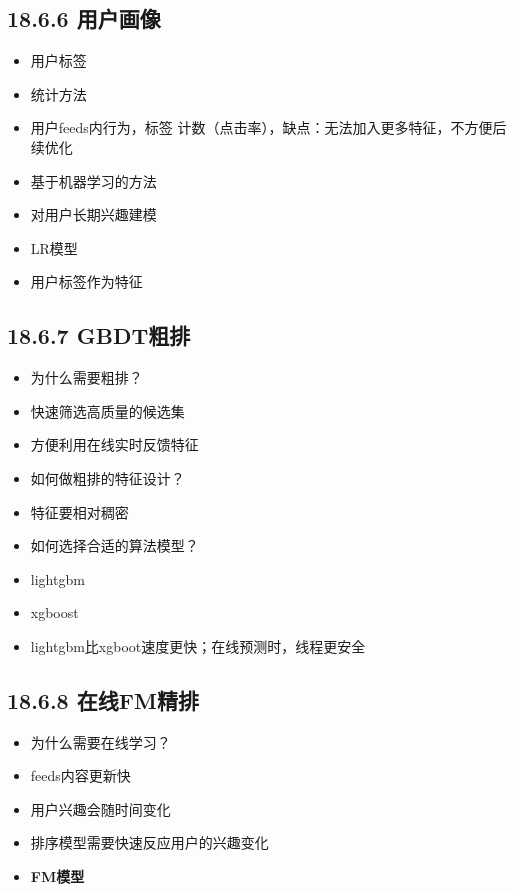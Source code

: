 \subsection{18.6.6 用户画像}\label{ux7528ux6237ux753bux50cf}

\begin{itemize}
\item
  用户标签
\item
  统计方法
\item
  用户feeds内行为，标签
  计数（点击率），缺点：无法加入更多特征，不方便后续优化
\item
  基于机器学习的方法
\item
  对用户长期兴趣建模
\item
  LR模型
\item
  用户标签作为特征
\end{itemize}

\subsection{18.6.7 GBDT粗排}\label{gbdtux7c97ux6392}

\begin{itemize}
\item
  为什么需要粗排？
\item
  快速筛选高质量的候选集
\item
  方便利用在线实时反馈特征
\item
  如何做粗排的特征设计？
\item
  特征要相对稠密
\item
  如何选择合适的算法模型？
\item
  lightgbm
\item
  xgboost
\item
  lightgbm比xgboot速度更快；在线预测时，线程更安全
\end{itemize}

\subsection{18.6.8 在线FM精排}\label{ux5728ux7ebffmux7cbeux6392}

\begin{itemize}
\item
  为什么需要在线学习？
\item
  feeds内容更新快
\item
  用户兴趣会随时间变化
\item
  排序模型需要快速反应用户的兴趣变化
\item
  \textbf{FM模型}
\end{itemize}

